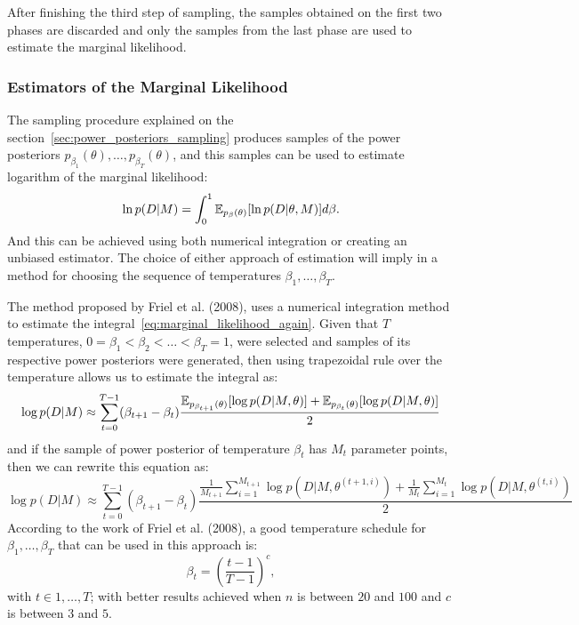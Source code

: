After finishing the third step of sampling, the samples obtained on the
first two phases are discarded and only the samples from the last phase
are used to estimate the marginal likelihood.

\subsubsection{Estimators of the Marginal Likelihood}
The sampling procedure explained on the 
section~\ref{sec:power_posteriors_sampling} produces samples of the 
power posteriors $p_{\beta_1} (\theta), \ldots, p_{\beta_T} (\theta)$, 
and this samples can be used to estimate logarithm of the marginal 
likelihood:
\begin{equation}
    \ln p (D | M) = \int_0^1 \mathbb{E}_{p_\beta (\theta)} 
        [\ln p(D|\theta, M)]d\beta.
    \label{eq:marginal_likelihood_again}
\end{equation}
And this can be achieved using both numerical integration or creating an
unbiased estimator. The choice of either approach of estimation will
imply in a method for choosing the sequence of temperatures $\beta_1, 
\ldots, \beta_T$. 

The method proposed by Friel et al. (2008), uses a numerical integration 
method to estimate the integral~\ref{eq:marginal_likelihood_again}. 
Given that $T$ temperatures, $0 = \beta_1 < \beta_2 < \ldots < \beta_T = 
1$, were selected and samples of its respective power posteriors were 
generated, then using trapezoidal rule over the temperature allows us to 
estimate the integral as:
\begin{equation*}
    \log{p(D| M)} \approx \sum_{t = 0}^{T - 1} (\beta_{t + 1} - \beta_t)
\frac{
    \mathbb{E}_{p_{\beta_{t + 1}} (\theta)}[\log p(D | M, \theta)]
+ 
    \mathbb{E}_{p_{\beta_{t}} (\theta)}[\log p(D | M, \theta)]}
{2}
\end{equation*}
and if the sample of power posterior of temperature $\beta_t$ has $M_t$
parameter points, then we can rewrite this equation as:
\begin{equation}
\log{p(D| M)} \approx \sum_{t = 0}^{T - 1} (\beta_{t + 1} - \beta_t)
\frac{
    \frac{1}{M_{t + 1}}
    \sum_{i = 1}^{M_{t + 1}}  \log p(D | M, \theta^{(t + 1, i)})
+ 
    \frac{1}{M_t}
    \sum_{i = 1}^{M_t}  \log p(D | M, \theta^{(t, i)})}
{2}
\end{equation}
According to the work of Friel et al. (2008), a good temperature 
schedule for $\beta_1, \ldots, \beta_T$ that can be used in this 
approach is:
\begin{equation*}
    \beta_t = \left(\frac{t - 1}{T - 1}\right)^{c}, 
\end{equation*}
with $t \in {1, \ldots, T}$; with better results achieved when $n$ is
between $20$ and $100$ and $c$ is between $3$ and $5$.

